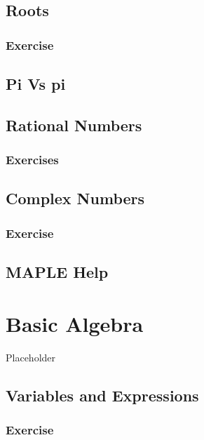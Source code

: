 \documentclass[
]{book}
\theoremstyle{definition}
\theoremstyle{definition}
\theoremstyle{definition}
\theoremstyle{definition}
\theoremstyle{remark}
\begin{document}
\section{Roots}\label{roots}

\subsection{Exercise}\label{exercise}

\section{Pi Vs pi}\label{pi-vs-pi}

\section{Rational Numbers}\label{rational-numbers}

\subsection{Exercises}\label{exercises-1}

\section{Complex Numbers}\label{complex-numbers}

\subsection{Exercise}\label{exercise-1}

\section{MAPLE Help}\label{maple-help}

\chapter{Basic Algebra}\label{basic-algebra}

Placeholder

\section{Variables and Expressions}\label{variables-and-expressions}

\subsection{Exercise}\label{exercise-2}
\end{document}
